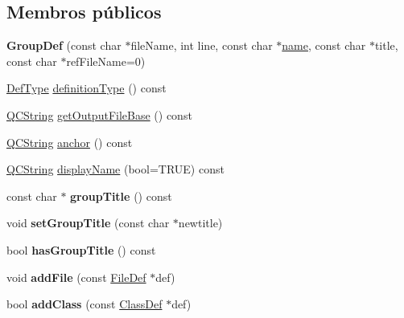 \subsection*{Membros públicos}
\begin{DoxyCompactItemize}
\item 
\hypertarget{class_group_def_aa708d8a2d557fdef1d17b0f4300049c6}{{\bfseries Group\-Def} (const char $\ast$file\-Name, int line, const char $\ast$\hyperlink{class_definition_a2c310e06c9aadc6fb218f80fcbb5c695}{name}, const char $\ast$title, const char $\ast$ref\-File\-Name=0)}\label{class_group_def_aa708d8a2d557fdef1d17b0f4300049c6}

\item 
\hyperlink{class_definition_intf_a2dc566dfec40397b2990e6520536ecb5}{Def\-Type} \hyperlink{class_group_def_aac410235a8bf90e471e649bd9dbf9c5e}{definition\-Type} () const 
\item 
\hyperlink{class_q_c_string}{Q\-C\-String} \hyperlink{class_group_def_af72a982ba8198cd5c98e9fc850b71df6}{get\-Output\-File\-Base} () const 
\item 
\hyperlink{class_q_c_string}{Q\-C\-String} \hyperlink{class_group_def_acd17ae1d9600f864b1beb85dfb99a4f4}{anchor} () const 
\item 
\hyperlink{class_q_c_string}{Q\-C\-String} \hyperlink{class_group_def_a67d09f414df966d11bbeba6298307bdf}{display\-Name} (bool=T\-R\-U\-E) const 
\item 
\hypertarget{class_group_def_a7f1a76d809e3fe2d6d33e45d2099992c}{const char $\ast$ {\bfseries group\-Title} () const }\label{class_group_def_a7f1a76d809e3fe2d6d33e45d2099992c}

\item 
\hypertarget{class_group_def_a87582078e180326fb761f95d9694a809}{void {\bfseries set\-Group\-Title} (const char $\ast$newtitle)}\label{class_group_def_a87582078e180326fb761f95d9694a809}

\item 
\hypertarget{class_group_def_aee17a67a0887fd32c52f3be1d9f4f378}{bool {\bfseries has\-Group\-Title} () const }\label{class_group_def_aee17a67a0887fd32c52f3be1d9f4f378}

\item 
\hypertarget{class_group_def_a69d23df7845329f2d8711d56c2ab0495}{void {\bfseries add\-File} (const \hyperlink{class_file_def}{File\-Def} $\ast$def)}\label{class_group_def_a69d23df7845329f2d8711d56c2ab0495}

\item 
\hypertarget{class_group_def_ab25e6422e3bd42375bafc86acfb48183}{bool {\bfseries add\-Class} (const \hyperlink{class_class_def}{Class\-Def} $\ast$def)}\label{class_group_def_ab25e6422e3bd42375bafc86acfb48183}


\end{DoxyCompactItemize}

